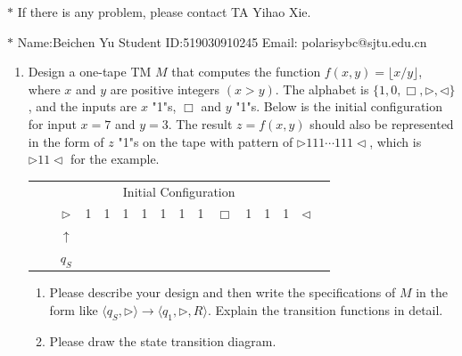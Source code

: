 \documentclass[12pt,a4paper]{article}
\theoremstyle{definition}
\begin{document}
\noindent

\noindent{}
\begin{center}
\footnotesize{\color{red}$*$ If there is any problem, please contact TA Yihao Xie. }

\footnotesize{\color{blue}$*$ Name:Beichen Yu \quad Student ID:519030910245 \quad Email: polarisybc@sjtu.edu.cn}
\end{center}

\begin{enumerate}
    \item Design a one-tape TM $M$ that computes the function $f(x, y) = \lfloor x/y \rfloor$, where $x$ and $y$ are positive integers $(x > y)$. The alphabet is $\{1, 0, \Box, \triangleright, \triangleleft\}$, and the inputs are $x$ "1"s, $\Box$ and $y$ "1"s. Below is the initial configuration for input $x=7$ and $y=3$. The result $z=f(x,y)$ should also be represented in the form of $z$ "1"s on the tape with pattern of $\rhd 111\cdots 111\lhd$, which is $\rhd 11\lhd$ for the example.
    
	\begin{center}
		\begin{tabular}{ll|c|c|c|c|c|c|c|c|c|c|c|c|c|c}
			& \multicolumn{14}{c}{Initial Configuration}\\[5pt]
			\cline{2-16}
			& & $\triangleright$ &  1  & 1 & 1 & 1 & 1 & 1 & 1 & $\Box$ & 1 & 1 & 1 & $ \triangleleft$ & \\
			\cline{2-16}
			\multicolumn{2}{c}{} & \multicolumn{1}{c}{$\uparrow$} & \multicolumn{11}{c}{}\\[-4px]
			\multicolumn{2}{c}{} & \multicolumn{1}{c}{$q_S$} & \multicolumn{11}{c}{}	
		\end{tabular}
	\end{center}

    \begin{enumerate}
	\item
	Please describe your design and then write the specifications of $M$ in the form like $\langle q_S, \triangleright \rangle \rightarrow \langle q_1, \triangleright,  R\rangle$. Explain the transition functions in detail.
	
	\item
	Please draw the state transition diagram.
	

\end{enumerate}
\end{enumerate}
\end{document}
